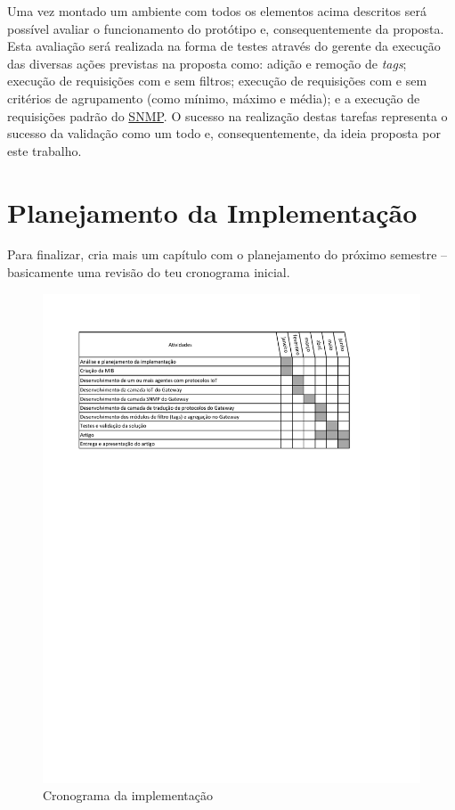 \documentclass[twoside,english,brazilian]{UNISINOSmonografia}
\begin{document}
Uma vez montado um ambiente com todos os elementos acima descritos será 
possível avaliar o funcionamento do protótipo e, consequentemente da proposta.
Esta avaliação será realizada na forma de testes através do gerente da 
execução das diversas ações previstas na proposta como:
adição e remoção de \textit{tags};
execução de requisições com e sem filtros;
execução de requisições com e sem critérios de agrupamento (como mínimo, 
máximo e média);
e a execução de requisições padrão do \hyperref[siglas]{SNMP}.
O sucesso na realização destas tarefas representa o sucesso da validação como 
um todo e, consequentemente, da ideia proposta por este trabalho.


\chapter{Planejamento da Implementação}
Para finalizar, cria mais um capítulo com o planejamento do próximo semestre 
-- basicamente uma revisão do teu cronograma inicial.


\begin{figure}
	\caption{Cronograma da implementação}
	\label{fig:crono}
	\centering
	\begin{minipage}{.8\textwidth}
		\includegraphics[clip,trim=20mm 185mm 40mm 20mm,width=\textwidth,keepaspectratio=true]{crono_tcc2}
	\end{minipage}
\end{figure}
\end{document}
